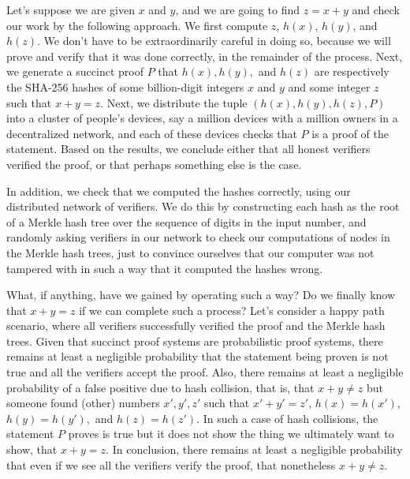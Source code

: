 \documentclass[11pt]{article}
\begin{document}
Let's suppose we are given $x$ and $y$, and we are going to find $z = x + y$ and check
our work by the following approach. We first compute $z$, $h(x)$, $h(y)$, and $h(z)$.
We don't have to be extraordinarily careful in doing so, because we will prove and verify
that it was done correctly, in the remainder of the process. Next, we generate
a succinct proof $P$ that $h(x), h(y),$ and $h(z)$ are respectively the SHA-256
hashes of some billion-digit integers $x$ and $y$ and some integer $z$ such that
$x + y = z$. Next, we distribute the tuple $(h(x), h(y), h(z), P)$ into a cluster of
people's devices, say a million devices with a million owners in a decentralized
network, and each of these devices checks that $P$ is a proof of the statement.
Based on the results, we conclude either that all honest verifiers verified the proof,
or that perhaps something else is the case.

In addition, we check that we computed the hashes correctly, using our distributed 
network of verifiers. We do this by constructing each hash as the root of a Merkle
hash tree over the sequence of digits in the input number, and randomly asking verifiers
in our network to check our computations of nodes in the Merkle hash trees, just
to convince ourselves that our computer was not tampered with in such a way that it
computed the hashes wrong.

What, if anything, have we gained by operating such a way? Do we finally know that
$x + y = z$ if we can complete such a process? Let's consider a happy path scenario,
where all verifiers successfully verified the proof and the Merkle hash trees.
Given that succinct proof systems are probabilistic proof systems, there remains at
least a negligible probability that the statement being proven is not true and all
the verifiers accept the proof. Also,
there remains at least a negligible probability of a false positive due to hash collision,
that is, that $x + y \neq z$ but someone found (other) numbers $x', y', z'$ such
that $x' + y' = z'$, $h(x) = h(x')$, $h(y) = h(y'),$ and $h(z) = h(z')$. In such a
case of hash collisions, the statement $P$ proves is true but it does not show the
thing we ultimately want to show, that $x + y = z$. In conclusion, there remains at least a negligible
probability that even if we see all the verifiers verify the proof, that nonetheless
$x + y \neq z$.
\end{document}
